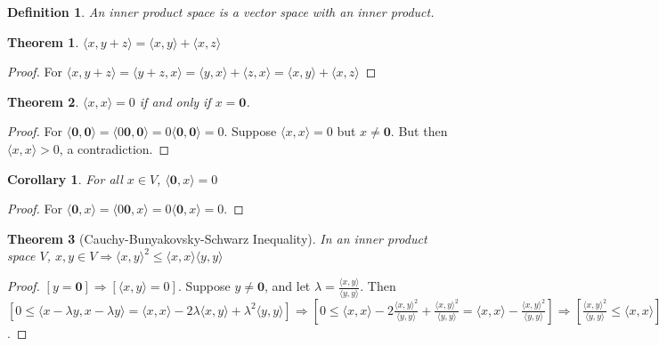 \documentclass[oneside]{book}
\theoremstyle{mystyle}
\newtheorem{theorem}{Theorem}[section]
\newtheorem{definition}{Definition}[section]
\newtheorem{corollary}{Corollary}[section]
\begin{document}
\begin{definition}
An inner product space is a vector space with an inner product.
\end{definition}

\begin{theorem}
$\langle x,y+z \rangle = \langle x,y \rangle + \langle x,z \rangle$
\end{theorem}
\begin{proof}
For $\langle x,y+z \rangle = \langle y+z,x \rangle = \langle y,x \rangle + \langle z,x \rangle = \langle x,y \rangle + \langle x,z \rangle$
\end{proof}

\begin{theorem}
$\langle x,x \rangle = 0$ if and only if $x= \mathbf{0}$.
\end{theorem}
\begin{proof}
For $\langle \mathbf{0}, \mathbf{0} \rangle = \langle 0\mathbf{0},\mathbf{0} \rangle = 0 \langle \mathbf{0},\mathbf{0}\rangle = 0$. Suppose $\langle x,x \rangle =0$ but $x\ne \mathbf{0}$. But then $\langle x,x \rangle >0$, a contradiction.
\end{proof}

\begin{corollary}
For all $x\in V$, $\langle \mathbf{0},x \rangle = 0$
\end{corollary}
\begin{proof}
For $\langle \mathbf{0}, x\rangle = \langle 0\mathbf{0},x \rangle = 0\langle \mathbf{0},x\rangle = 0$.
\end{proof}

\begin{theorem}[Cauchy-Bunyakovsky-Schwarz Inequality]
In an inner product space $V$, $x,y\in V\Rightarrow \langle x,y \rangle^2 \leq \langle x,x \rangle \langle y,y \rangle$
\end{theorem}
\begin{proof}
$[y=\mathbf{0}]\Rightarrow [\langle x,y\rangle = 0]$. Suppose $y\ne \mathbf{0}$, and let $\lambda = \frac{\langle x,y \rangle}{\langle y,y \rangle}$. Then $[0 \leq \langle x-\lambda y, x-\lambda y\rangle = \langle x,x \rangle - 2\lambda \langle x,y \rangle + \lambda^2 \langle y,y \rangle]\Rightarrow [0\leq \langle x,x \rangle - 2\frac{\langle x,y \rangle ^2 }{\langle y,y \rangle} + \frac{\langle x,y \rangle^2}{\langle y,y \rangle} = \langle x,x \rangle - \frac{\langle x,y \rangle^2}{\langle y,y \rangle}]\Rightarrow [\frac{\langle x,y \rangle ^2}{\langle y,y \rangle} \leq \langle x,x \rangle]\Rightarrow [\langle x,y \rangle^2 \leq \langle x,x \rangle \langle y,y \rangle]$.
\end{proof}
\end{document}
